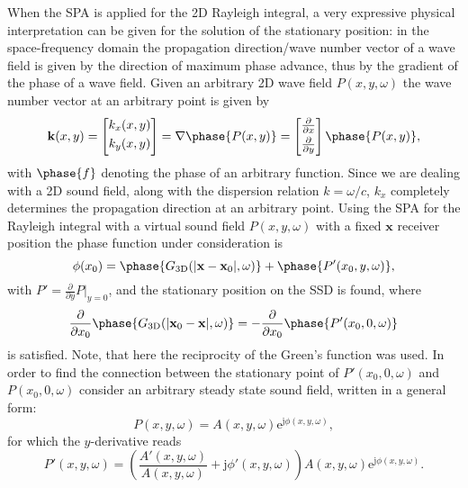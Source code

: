 \documentclass[12pt,a4paper]{article}
\newcommand{\te}{\mathrm{e}}
\newcommand{\ti}{\mathrm{j}}
\newcommand{\vx}{\mathbf{x}}
\newcommand{\vxo}{\mathbf{x}_0}
\begin{document}
When the SPA is applied for the 2D Rayleigh integral, a very expressive physical interpretation can be given for the solution of the stationary position:
in the space-frequency domain the propagation direction/wave number vector of a wave field is given by the direction of maximum phase advance, thus by the gradient of the phase of a wave field. Given an arbitrary 2D wave field $P(x,y,\omega)$ the wave number vector at an arbitrary point is given by
\begin{equation}
\mathbf{k}(x,y) = \begin{bmatrix} k_x(x,y) \\[0.3em] k_y(x,y)\\[0.3em]    \end{bmatrix} = \nabla \phase{P(x,y)} = \begin{bmatrix} \frac{\partial}{\partial x} \\[0.3em] \frac{\partial}{\partial y}\\[0.3em] \end{bmatrix}   \phase{P(x,y)},
\end{equation}
with $\phase{f}$ denoting the phase of an arbitrary function.
Since we are dealing with a 2D sound field, along with the dispersion relation $k = \omega/c$, $k_x$ completely determines the propagation direction at an arbitrary point.
Using the SPA for the Rayleigh integral with a virtual sound field $P(x,y,\omega)$ with a fixed $\vx$ receiver position the phase function under consideration is 
\begin{equation}
\phi(x_0) =  \phase{G_{\mathrm{3D}}(|\vx-\vxo|,\omega)} + \phase{ P'(x_0,y,\omega)},
\end{equation}
with $P' =  \frac{\partial}{\partial y}P|_{y = 0} $,
and the stationary position on the SSD is found, where 
\begin{equation}
\frac{ \partial }{\partial x_0} \phase{G_{\mathrm{3D}}(|\vxo-\vx|,\omega)} = - \frac{ \partial }{\partial x_0} \phase{ P'(x_0,0,\omega) }
\end{equation}
is satisfied. Note, that here the reciprocity of the Green's function was used. In order to find the connection between the stationary point of $P'(x_0,0,\omega)$ and $P(x_0,0,\omega)$ consider an arbitrary steady state sound field, written in a general form:
\begin{equation}
P(x,y,\omega) = A(x,y,\omega)\te^{\ti \phi(x,y,\omega)},
\end{equation}
for which the $y$-derivative reads
\begin{equation}
P'(x,y,\omega) = \left( \frac{A'(x,y,\omega)}{A(x,y,\omega)} + \ti \phi'(x,y,\omega) \right) A(x,y,\omega)\te^{\ti \phi(x,y,\omega)}.
\end{equation}
\end{document}
